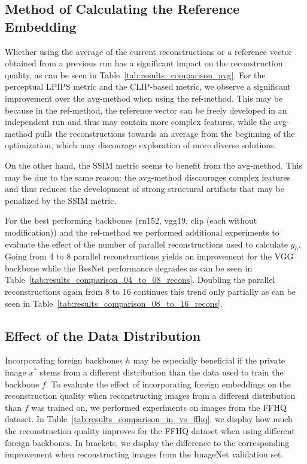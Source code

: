 \documentclass[10pt,twocolumn]{article}
\begin{document}
\subsection{Method of Calculating the Reference Embedding}
Whether using the average of the current reconstructions or a reference vector obtained from a previous run has a significant impact on the reconstruction quality, as can be seen in Table~\ref{tab:results_comparison_avg}.
For the perceptual LPIPS metric and the CLIP-based metric, we observe a significant improvement over the avg-method when using the ref-method.
This may be because in the ref-method, the reference vector can be freely developed in an independent run and thus may contain more complex features, while the avg-method pulls the reconstructions towards an average from the beginning of the optimization, which may discourage exploration of more diverse solutions.

On the other hand, the SSIM metric seems to benefit from the avg-method.
This may be due to the same reason: the avg-method discourages complex features and thus reduces the development of strong structural artifacts that may be penalized by the SSIM metric.

For the best performing backbones (rn152, vgg19, clip (each without modification)) and the ref-method we performed additional experiments to evaluate the effect of the number of parallel reconstructions used to calculate $y_h$.
Going from 4 to 8 parallel reconstructions yields an improvement for the VGG backbone while the ResNet performance degrades as can be seen in Table~\ref{tab:results_comparison_04_to_08_recons}.
Doubling the parallel reconstructions again from 8 to 16 continues this trend only partially as can be seen in Table~\ref{tab:results_comparison_08_to_16_recons}.

\subsection{Effect of the Data Distribution}
Incorporating foreign backbones $h$ may be especially beneficial if the private image $x^*$ stems from a different distribution than the data used to train the backbone $f$.
To evaluate the effect of incorporating foreign embeddings on the reconstruction quality when reconstructing images from a different distribution than $f$ was trained on, we performed experiments on images from the FFHQ dataset.
In Table~\ref{tab:results_comparison_in_vs_ffhq}, we display how much the reconstruction quality improves for the FFHQ dataset when using different foreign backbones.
In brackets, we display the difference to the corresponding improvement when reconstructing images from the ImageNet validation set.
\end{document}
